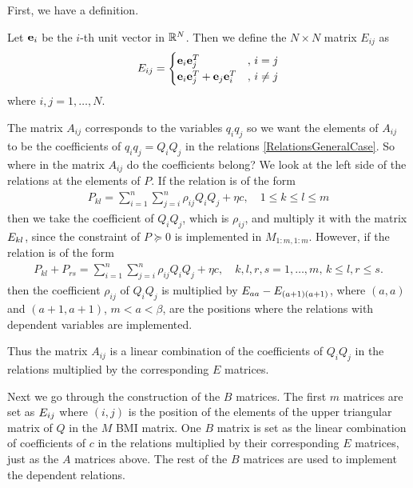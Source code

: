 \documentclass[a4paper,12pt,twoside,BCOR=10mm]{scrbook}
\begin{document}
First, we have a definition.
\begin{definition}
Let $\mathbf{e}_i$ be the $i$-th unit vector in $\mathbb{R}^{N}$. Then we define the $N\times N$ matrix $E_{ij}$ as
\begin{align*}
    E_{ij} = \begin{cases}
    \mathbf{e}_i \mathbf{e}_j^T &,\, i = j\\
    \mathbf{e}_i \mathbf{e}_j^T + \mathbf{e}_j \mathbf{e}_i^T &,\, i \neq j 
    \end{cases}
\end{align*}
where $i,j = 1, \ldots, N$.
\end{definition}


The matrix $A_{ij}$ corresponds to the variables $q_iq_j$ so we want the elements of $A_{ij}$ to be the coefficients of $q_iq_j = Q_iQ_j$ in the relations \eqref{RelationsGeneralCase}. So where in the matrix $A_{ij}$ do the coefficients belong? We look at the left side of the relations at the elements of $P$. If the relation is of the form
\begin{align*}
    P_{kl} = \sum_{i = 1}^n\sum_{j = i}^n \rho_{ij}Q_iQ_j + \eta c, \quad 1 \leq k \leq l \leq m
\end{align*}
then we take the coefficient of $Q_iQ_j$, which is $\rho_{ij}$, and multiply it with the matrix $E_{kl}$, since the constraint of $P \succeq 0$ is implemented in $M_{1:m, 1:m}$. However, if the relation is of the form
\begin{align*}
    P_{kl} + P_{rs} = \sum_{i = 1}^n\sum_{j = i}^n \rho_{ij}Q_iQ_j + \eta c, \quad k,l,r,s = 1, \ldots, m, \, k \leq l, r\leq s.
\end{align*}
then the coefficient $\rho_{ij}$ of $Q_i Q_j$ is multiplied by $E_{aa} - E_{(a+1)(a+1)}$, where $(a,a)$ and $(a+1,a+1)$, $m < a < \beta$, are the positions where the relations with dependent variables are implemented.

Thus the matrix $A_{ij}$ is a linear combination of the coefficients of $Q_iQ_j$ in the relations multiplied by the corresponding $E$ matrices.

Next we go through the construction of the $B$ matrices. The first $m$ matrices are set as $E_{ij}$ where $(i,j)$ is the position of the elements of the upper triangular matrix of $Q$ in the $M$ BMI matrix. One $B$ matrix is set as the linear combination of coefficients of $c$ in the relations multiplied by their corresponding $E$ matrices, just as the $A$ matrices above. The rest of the $B$ matrices are used to implement the dependent relations.
\end{document}

